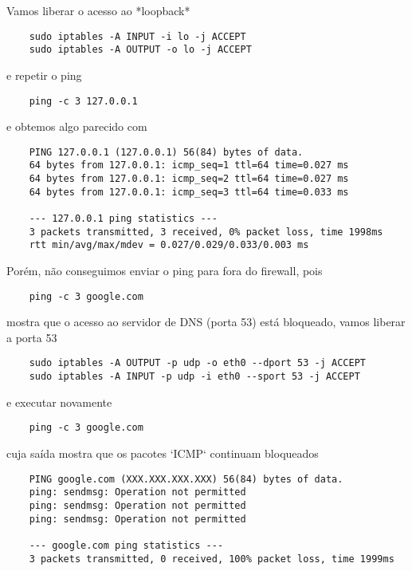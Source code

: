 Vamos liberar o acesso ao *loopback*

\begin{lstlisting}
    sudo iptables -A INPUT -i lo -j ACCEPT
    sudo iptables -A OUTPUT -o lo -j ACCEPT
  \end{lstlisting}
  
\noindent e repetir o ping

\begin{lstlisting}
    ping -c 3 127.0.0.1
  \end{lstlisting}
  
\noindent e obtemos algo parecido com

\begin{lstlisting}
    PING 127.0.0.1 (127.0.0.1) 56(84) bytes of data.
    64 bytes from 127.0.0.1: icmp_seq=1 ttl=64 time=0.027 ms
    64 bytes from 127.0.0.1: icmp_seq=2 ttl=64 time=0.027 ms
    64 bytes from 127.0.0.1: icmp_seq=3 ttl=64 time=0.033 ms

    --- 127.0.0.1 ping statistics ---
    3 packets transmitted, 3 received, 0% packet loss, time 1998ms
    rtt min/avg/max/mdev = 0.027/0.029/0.033/0.003 ms
  \end{lstlisting}
  
Porém, não conseguimos enviar o ping para fora do firewall, pois

\begin{lstlisting}
    ping -c 3 google.com
  \end{lstlisting}
  
\noindent mostra que o acesso ao servidor de DNS (porta 53) está bloqueado, 
vamos liberar a porta 53

\begin{lstlisting}
    sudo iptables -A OUTPUT -p udp -o eth0 --dport 53 -j ACCEPT
    sudo iptables -A INPUT -p udp -i eth0 --sport 53 -j ACCEPT
  \end{lstlisting}
  
e executar novamente

\begin{lstlisting}
    ping -c 3 google.com
  \end{lstlisting}
  
\noindent cuja saída mostra que os pacotes `ICMP` continuam bloqueados

\begin{lstlisting}
    PING google.com (XXX.XXX.XXX.XXX) 56(84) bytes of data.
    ping: sendmsg: Operation not permitted
    ping: sendmsg: Operation not permitted
    ping: sendmsg: Operation not permitted

    --- google.com ping statistics ---
    3 packets transmitted, 0 received, 100% packet loss, time 1999ms
  \end{lstlisting}
  
